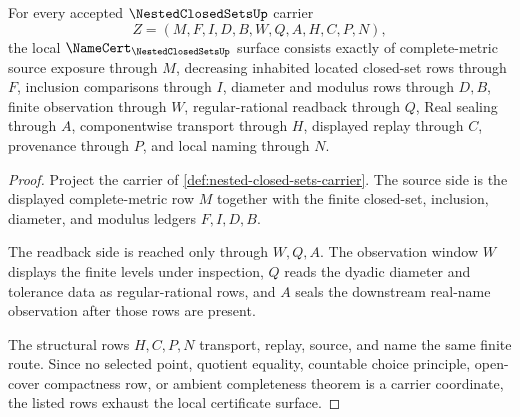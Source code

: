 \begin{theorem}
\label{thm:nested-closed-sets-namecert-obligations}
For every accepted $\NestedClosedSetsUp$ carrier
$$
Z=(M,F,I,D,B,W,Q,A,H,C,P,N),
$$
the local $\NameCert_{\NestedClosedSetsUp}$ surface consists exactly of complete-metric source exposure through $M$, decreasing inhabited located closed-set rows through $F$, inclusion comparisons through $I$, diameter and modulus rows through $D,B$, finite observation through $W$, regular-rational readback through $Q$, Real sealing through $A$, componentwise transport through $H$, displayed replay through $C$, provenance through $P$, and local naming through $N$.
\end{theorem}
\begin{proof}
Project the carrier of \autoref{def:nested-closed-sets-carrier}. The source side is the displayed complete-metric row $M$ together with the finite closed-set, inclusion, diameter, and modulus ledgers $F,I,D,B$.

The readback side is reached only through $W,Q,A$. The observation window $W$ displays the finite levels under inspection, $Q$ reads the dyadic diameter and tolerance data as regular-rational rows, and $A$ seals the downstream real-name observation after those rows are present.

The structural rows $H,C,P,N$ transport, replay, source, and name the same finite route. Since no selected point, quotient equality, countable choice principle, open-cover compactness row, or ambient completeness theorem is a carrier coordinate, the listed rows exhaust the local certificate surface.
\end{proof}

